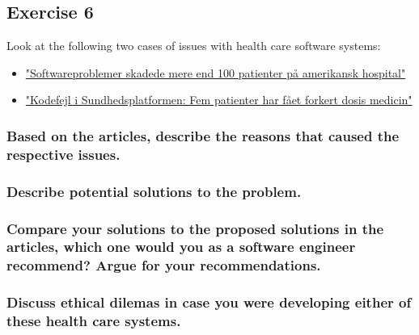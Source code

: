 \documentclass{article}
\begin{document}
\subsection*{Exercise 6}
Look at the following two cases of issues with health care software systems:
\begin{itemize}
    \item \href{https://www.version2.dk/artikel/softwareproblemer-skadede-mere-end-100-patienter-paa-amerikansk-hospital}{"Softwareproblemer skadede mere end 100 patienter på amerikansk hospital"}
    \item \href{https://www.version2.dk/artikel/kodefejl-i-sundhedsplatformen-fem-patienter-har-faaet-forkert-dosis-medicin}{"Kodefejl i Sundhedsplatformen: Fem patienter har fået forkert dosis medicin"}
\end{itemize}
\subsubsection*{Based on the articles, describe the reasons that caused the respective issues.}
\subsubsection*{Describe potential solutions to the problem.}
\subsubsection*{Compare your solutions to the proposed solutions in the articles, which one would you as a software engineer recommend? Argue for your recommendations.}
\subsubsection*{Discuss ethical dilemas in case you were developing either of these health care systems.}
\end{document}
